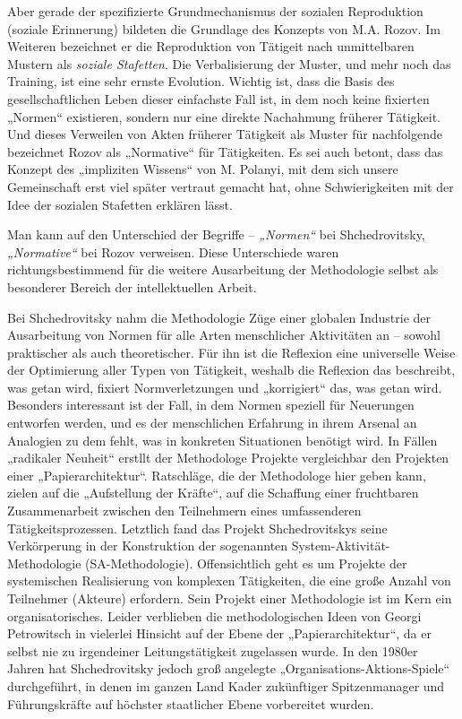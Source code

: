 \documentclass[11pt,a4paper]{article}
\begin{document}
Aber gerade der spezifizierte Grundmechanismus der sozialen Reproduktion
(soziale Erinnerung) bildeten die Grundlage des Konzepts von M.A. Rozov.  Im
Weiteren bezeichnet er die Reproduktion von Tätigeit nach unmittelbaren
Mustern als \emph{soziale Stafetten}. Die Verbalisierung der Muster, und mehr
noch das Training, ist eine sehr ernste Evolution. Wichtig ist, dass die Basis
des gesellschaftlichen Leben dieser einfachste Fall ist, in dem noch keine
fixierten „Normen“ existieren, sondern nur eine direkte Nachahmung früherer
Tätigkeit. Und dieses Verweilen von Akten früherer Tätigkeit als Muster für
nachfolgende bezeichnet Rozov als „Normative“ für Tätigkeiten.  Es sei auch
betont, dass das Konzept des „impliziten Wissens“ von M. Polanyi, mit dem sich
unsere Gemeinschaft erst viel später vertraut gemacht hat, ohne
Schwierigkeiten mit der Idee der sozialen Stafetten erklären lässt.

Man kann auf den Unterschied der Begriffe -- \emph{„Normen“} bei
Shchedrovitsky, \emph{„Normative“} bei Rozov verweisen. Diese Unterschiede
waren richtungsbestimmend für die weitere Ausarbeitung der Methodologie selbst
als besonderer Bereich der intellektuellen Arbeit.

Bei Shchedrovitsky nahm die Methodologie Züge einer globalen Industrie der
Ausarbeitung von Normen für alle Arten menschlicher Aktivitäten an -- sowohl
praktischer als auch theoretischer. Für ihn ist die Reflexion eine universelle
Weise der Optimierung aller Typen von Tätigkeit, weshalb die Reflexion das
beschreibt, was getan wird, fixiert Normverletzungen und „korrigiert“ das, was
getan wird. Besonders interessant ist der Fall, in dem Normen speziell für
Neuerungen entworfen werden, und es der menschlichen Erfahrung in ihrem
Arsenal an Analogien zu dem fehlt, was in konkreten Situationen benötigt wird.
In Fällen „radikaler Neuheit“ erstllt der Methodologe Projekte vergleichbar
den Projekten einer „Papierarchitektur“. Ratschläge, die der Methodologe hier
geben kann, zielen auf die „Aufstellung der Kräfte“, auf die Schaffung einer
fruchtbaren Zusammenarbeit zwischen den Teilnehmern eines umfassenderen
Tätigkeitsprozessen. Letztlich fand das Projekt Shchedrovitskys seine
Verkörperung in der Konstruktion der sogenannten System-Aktivität-Methodologie
(SA-Methodologie). Offensichtlich geht es um Projekte der systemischen
Realisierung von komplexen Tätigkeiten, die eine große Anzahl von Teilnehmer
(Akteure) erfordern. Sein Projekt einer Methodologie ist im Kern ein
organisatorisches. Leider verblieben die methodologischen Ideen von Georgi
Petrowitsch in vielerlei Hinsicht auf der Ebene der „Papierarchitektur“, da er
selbst nie zu irgendeiner Leitungstätigkeit zugelassen wurde. In den 1980er
Jahren hat Shchedrovitsky jedoch groß angelegte „Organisations-Aktions-Spiele“
durchgeführt, in denen im ganzen Land Kader zukünftiger Spitzenmanager und
Führungskräfte auf höchster staatlicher Ebene vorbereitet wurden.
\end{document}
